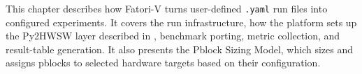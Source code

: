 This chapter describes how \ac{Fatori-V} turns user-defined \texttt{.yaml} run files into configured experiments. It covers the run infrastructure, how the platform sets up the Py2HWSW layer described in , benchmark porting, metric collection, and result-table generation. It also presents the Pblock Sizing Model, which sizes and assigns pblocks to selected hardware targets based on their configuration.

